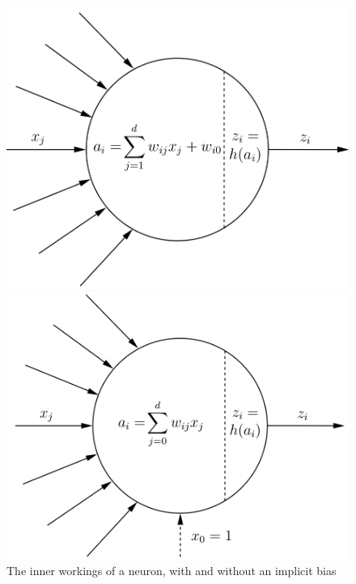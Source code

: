 \begin{figure}[!tbp]
  \centering
  \begin{minipage}[b]{0.45\textwidth}
    \includegraphics[width=\textwidth]{./pictures/method/Neuron.png}
  \end{minipage}
  \hfill
  \begin{minipage}[b]{0.45\textwidth}
    \includegraphics[width=\textwidth]{./pictures/method/NeuronBias.png}
  \end{minipage}
    \caption{The inner workings of a neuron, with and without an implicit
bias \cite{Igel}}
\label{fig:neuron}
\end{figure}

